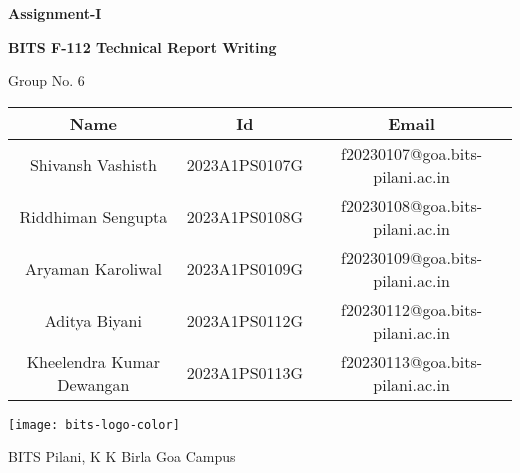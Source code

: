 \begin{titlepage}

	\begin{center}

		\vspace*{1cm}
		\Huge
		\textbf{Assignment-I}

		\vspace{0.5cm}

		\LARGE
		\textbf{BITS F-112 Technical Report Writing}

		\vspace{0.8cm}

		\Large	
		Group No. 6

		\vspace{0.6cm}

		\normalsize
		\begingroup
		\setlength{\tabcolsep}{10pt}
		\renewcommand{\arraystretch}{1.8}
		\begin{tabular} { || c | c | c || }
			\hline
			Name & Id & Email \\ [0.5ex]
			\hline \hline

			\hline  
			Shivansh Vashisth & 2023A1PS0107G & f20230107@goa.bits-pilani.ac.in \\  
			Riddhiman Sengupta & 2023A1PS0108G & f20230108@goa.bits-pilani.ac.in \\
			Aryaman Karoliwal & 2023A1PS0109G & f20230109@goa.bits-pilani.ac.in \\
			Aditya Biyani & 2023A1PS0112G & f20230112@goa.bits-pilani.ac.in \\
			Kheelendra Kumar Dewangan & 2023A1PS0113G & f20230113@goa.bits-pilani.ac.in \\
			[1ex]
			\hline
		\end{tabular}
		\endgroup
		

		\vfill

		\texttt{[image: bits-logo-color]}

		\Large
		BITS Pilani, K K Birla Goa Campus \\ 
	\end{center}

\end{titlepage}


